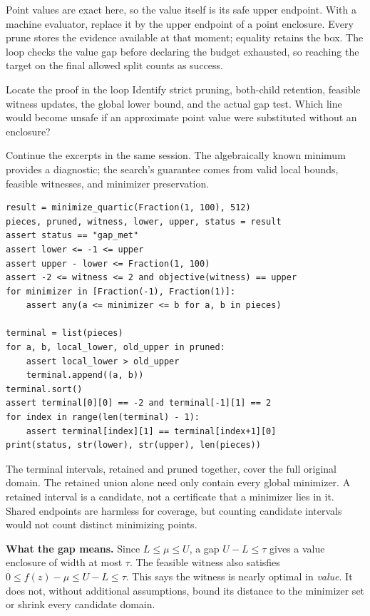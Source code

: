 Point values are exact here, so the value itself is its safe upper endpoint.
With a machine evaluator, replace it by the upper endpoint of a point
enclosure. Every prune stores the evidence available at that moment; equality
retains the box. The loop checks the value gap before declaring the budget
exhausted, so reaching the target on the final allowed split counts as success.

\begin{question}{Locate the proof in the loop}
Identify strict pruning, both-child retention, feasible witness updates,
the global lower bound, and the actual gap test. Which line would become
unsafe if an approximate point value were substituted without an enclosure?
\end{question}

\newpage
{}
Continue the excerpts in the same session. The algebraically known minimum
provides a diagnostic; the search's guarantee comes from valid local bounds,
feasible witnesses, and minimizer preservation.
\begin{lstlisting}
result = minimize_quartic(Fraction(1, 100), 512)
pieces, pruned, witness, lower, upper, status = result
assert status == "gap_met"
assert lower <= -1 <= upper
assert upper - lower <= Fraction(1, 100)
assert -2 <= witness <= 2 and objective(witness) == upper
for minimizer in [Fraction(-1), Fraction(1)]:
    assert any(a <= minimizer <= b for a, b in pieces)

terminal = list(pieces)
for a, b, local_lower, old_upper in pruned:
    assert local_lower > old_upper
    terminal.append((a, b))
terminal.sort()
assert terminal[0][0] == -2 and terminal[-1][1] == 2
for index in range(len(terminal) - 1):
    assert terminal[index][1] == terminal[index+1][0]
print(status, str(lower), str(upper), len(pieces))
\end{lstlisting}

The terminal intervals, retained and pruned together, cover the full
original domain. The retained union alone need only contain every global
minimizer. A retained interval is a candidate, not a certificate that a
minimizer lies in it. Shared endpoints are harmless for coverage, but
counting candidate intervals would not count distinct minimizing points.

\textbf{What the gap means.} Since $L\le\mu\le U$, a gap $U-L\le\tau$
gives a value enclosure of width at most $\tau$. The feasible witness also
satisfies $0\le f(z)-\mu\le U-L\le\tau$. This says the witness is nearly
optimal in \emph{value}. It does not, without additional assumptions,
bound its distance to the minimizer set or shrink every candidate domain.

